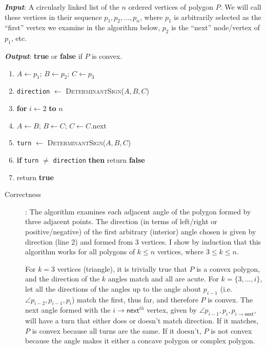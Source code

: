 \documentclass [12pt]{article}
\begin{document}
\begin{enumerate}[label=(\alph*)]
            \emph{\textbf{Input}}: A circularly linked list of the $n$ ordered vertices of polygon $P$. We will call these vertices in their sequence $p_1, p_2, ..., p_n$, where $p_1$ is arbitrarily selected as the ``first'' vertex we examine in the algorithm below, $p_2$ is the ``next'' node/vertex of $p_1$, etc.

            \emph{\textbf{Output}}: \textbf{true} or \textbf{false} if $P$ is convex.

            \cbstart
            \begin{enumerate}[label=\arabic*.]
                \item $A \leftarrow p_1$; $B \leftarrow p_2$; $C \leftarrow p_3$
                \item \texttt{direction} $\leftarrow$ \textsc{DeterminantSign}($A, B, C$)
                \item \textbf{for} $i \leftarrow 2$ \textbf{to} $n$ 
                \item \hspace{1cm} $A \leftarrow B$; $B \leftarrow C$; $C \leftarrow C$.\textsf{next}
                \item \hspace{1cm} \texttt{turn} $\leftarrow$ \textsc{DeterminantSign}($A, B, C$)
                \item \hspace{1cm} \textbf{if} \texttt{turn} $\neq$ \texttt{direction} \textbf{then} return \textbf{false}
                \item return \textbf{true}
            \end{enumerate}
            \cbend

            \begin{description}
                \item[Correctness]: The algorithm examines each adjacent angle of the polygon formed by three adjacent points. The direction (in terms of left/right or positive/negative) of the first arbitrary (interior) angle chosen is given by \textsf{direction} (line 2) and formed from 3 vertices. I show by induction that this algorithm works for all polygons of $k \leq n$ vertices, where $3 \leq k \leq n$.
                
                For $k = 3$ vertices (triangle), it is trivially true that $P$ is a convex polygon, and the  direction of the $k$ angles match and all are acute. For $k = \{3, ..., i\}$, let all the directions of the angles up to the angle about $p_{i-1}$ (i.e. $\angle p_{i-2}, p_{i-1}, p_i$) match the first, thus far, and therefore $P$ is convex. The next angle formed with the $i\rightarrow\textsf{next}^{th}$ vertex, given by $\angle p_{i-1}, p_{i}, p_{i\rightarrow\textsf{next}}$, will have a \textsf{turn} that either does or doesn't match \textsf{direction}. If it matches, $P$ is convex because all turns are the same. If it doesn't, $P$ is not convex because the angle makes it either a concave polygon or complex polygon.
                


\end{description}
\end{enumerate}
\end{document}
